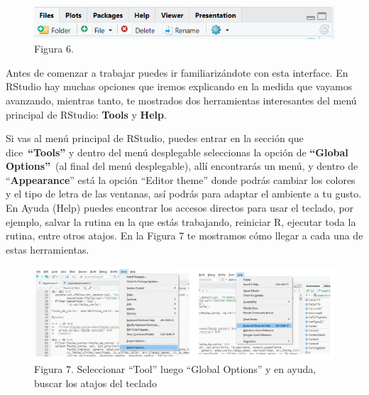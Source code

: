 \documentclass[
  letterpaper,
  DIV=11,
  numbers=noendperiod]{scrreprt}
\begin{document}
\begin{enumerate}
  \begin{figure}[H]

  {\centering \includegraphics[width=5.32292in,height=\textheight,keepaspectratio]{imagenes/01figura06.png}

  }

  \caption{Figura 6.}

  \end{figure}%
\end{enumerate}

Antes de comenzar a trabajar puedes ir familiarizándote con esta
interface. En RStudio hay muchas opciones que iremos explicando en la
medida que vayamos avanzando, mientras tanto, te mostrados dos
herramientas interesantes del menú principal de RStudio: \textbf{Tools}
y \textbf{Help}.

Si vas al menú principal de RStudio, puedes entrar en la sección que
dice~\textbf{``Tools''} y dentro del menú desplegable seleccionas la
opción de \textbf{``Global Options''}~(al final del menú desplegable),
allí encontrarás un menú, y dentro de ``\textbf{Appearance}'' está la
opción ``Editor theme'' donde podrás cambiar los colores y el tipo de
letra de las ventanas, así podrás para adaptar el ambiente a tu gusto.
En Ayuda (Help) puedes encontrar los accesos directos para usar el
teclado, por ejemplo, salvar la rutina en la que estás trabajando,
reiniciar R, ejecutar toda la rutina, entre otros atajos. En la Figura 7
te mostramos cómo llegar a cada una de estas herramientas.

\begin{figure}[H]

{\centering \includegraphics[width=8.48in,height=\textheight,keepaspectratio]{imagenes/01menurstudio.png}

}

\caption{Figura 7. Seleccionar ``Tool'' luego ``Global Options'' y en
ayuda, buscar los atajos del teclado}

\end{figure}%
\end{document}
